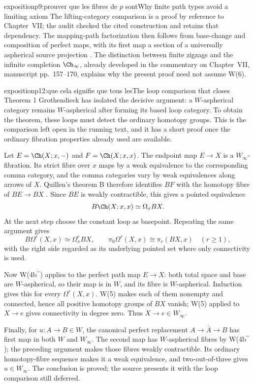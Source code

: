 \begin{dcomment}{exposition}{p9:prouver que les fibres de $p$ sont}{Why finite path types avoid a limiting axiom}
The lifting-category comparison is a proof by reference to Chapter~VII; the audit checked the cited construction and retains that dependency. The mapping-path factorization then follows from base-change and composition of perfect maps, with its first map a section of a universally aspherical source projection \citep[manuscript pp.~170--171]{GrothendieckDerivateursVII}. The distinction between finite zigzags and the infinite completion \(\Ch_\infty\), already developed in the commentary on Chapter~VII, manuscript pp.~157--170, explains why the present proof need not assume W(6).
\end{dcomment}

\begin{dcomment}{exposition}{p12:que cela signifie que tous les}{The loop comparison that closes Theorem 1}
Grothendieck has isolated the decisive argument: a \(W\)-aspherical category remains \(W\)-aspherical after forming its based loop category. To obtain the theorem, these loops must detect the ordinary homotopy groups. This is the comparison left open in the running text, and it has a short proof once the ordinary fibration properties already used are available.

Let \(E=\Ch(X;x,-)\) and \(F=\Ch(X;x,x)\). The endpoint map \(E\to X\) is a \(W_\infty\)-fibration. Its strict fibre over \(x\) maps by a weak equivalence to the corresponding comma category, and the comma categories vary by weak equivalences along arrows of \(X\). Quillen's theorem B therefore identifies \(BF\) with the homotopy fibre of \(BE\to BX\) \citep[Theorem~B and its corollary, pp.~97--98]{Quillen1973}. Since \(BE\) is weakly contractible, this gives a pointed equivalence
\[
 B\Ch(X;x,x)\simeq\Omega_x BX.
\]
At the next step choose the constant loop as basepoint. Repeating the same argument gives
\[
 B\Omega^r(X,x)\simeq\Omega^r_x BX,\qquad
 \pi_0\Omega^r(X,x)\cong\pi_r(BX,x)
 \quad(r\geq1),
\]
with the right side regarded as its underlying pointed set where only connectivity is used.

Now W(4b\(^{\prime\prime}\)) applies to the perfect path map \(E\to X\): both total space and base are \(W\)-aspherical, so their map is in \(W\), and its fibre is \(W\)-aspherical. Induction gives this for every \(\Omega^r(X,x)\). W(5) makes each of them nonempty and connected, hence all positive homotopy groups of \(BX\) vanish; W(5) applied to \(X\to e\) gives connectivity in degree zero. Thus \(X\to e\in W_\infty\).

Finally, for \(u:A\to B\in W\), the canonical perfect replacement \(A\to\bar A\to B\) has first map in both \(W\) and \(W_\infty\). The second map has \(W\)-aspherical fibres by W(4b\(^{\prime\prime}\)); the preceding argument makes those fibres weakly contractible. Its ordinary homotopy-fibre sequence makes it a weak equivalence, and two-out-of-three gives \(u\in W_\infty\). The conclusion is proved; the source presents it with the loop comparison still deferred.
\end{dcomment}

